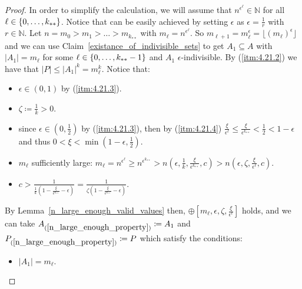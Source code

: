         \begin{proof}
            In order to simplify the calculation, we will assume that $n^{\epsilon^\ell} \in \mathbb{N}$ for all
            $\ell \in \left\{ 0, \dots, k_{**} \right\}$.
            Notice that can be easily achieved by setting $\epsilon$ as $\epsilon = \frac{1}{r}$ with $r \in \mathbb{N}$.
            Let $n = m_0 > m_1 > \dots > m_{k_{**}}$ with $m_\ell = n^{\epsilon^{\ell}}$.
            So $m_{\ell+1} = m_\ell^\epsilon = \lfloor (m_\ell)^\epsilon \rfloor$ and we can use Claim~\ref{existance_of_indivisible_sets}
            to get $A_1 \subseteq A$ with $|A_1| = m_\ell$ for some $\ell \in \left\{ 0, \dots, k_{**}-1 \right\}$ and $A_1$ $\epsilon$-indivisible.
            By (\ref{itm:4.21.2}) we have that $|P| \leq |A_1|^k = m_\ell^k$.
            Notice that:
            \begin{itemize}
                \item $\epsilon \in (0,1)$ by (\ref{itm:4.21.3}).
                \item $\zeta \coloneqq \frac{1}{k} > 0$.
                \item since $\epsilon \in \left( 0, \frac{1}{2} \right)$ by (\ref{itm:4.21.3}), then by (\ref{itm:4.21.4})
                    $\frac{\xi}{\epsilon^\ell} \leq \frac{\xi}{\epsilon^{k_{**}}} < \frac{1}{2} < 1 - \epsilon$ and
                    thus $0 < \xi < \min(1-\epsilon, \frac{1}{2})$.
                \item $m_\ell$ sufficiently large: $m_\ell = n^{\epsilon^\ell} \geq n^{\epsilon^{k_{**}}} > n\left( \epsilon, \frac{1}{k},
                    \frac{\xi}{\epsilon^{k_{**}}}, c \right) > n\left( \epsilon, \zeta, \frac{\xi}{\epsilon^{\ell}}, c \right)$.
                \item $c > \frac{1}{\frac{1}{k} (1 - \frac{\xi}{\epsilon^{k_{**}}} - \epsilon)}
                    = \frac{1}{\zeta (1 - \frac{\xi}{\epsilon^{k_{**}}} - \epsilon)}$.
            \end{itemize}
            By Lemma~\ref{n_large_enough_valid_values} then, $\oplus\left[ m_\ell, \epsilon, \zeta, \frac{\xi}{\epsilon^\ell} \right]$
            holds, and we can take $A_{(\ref{n_large_enough_property})} \coloneqq A_1$ and
            $P_{(\ref{n_large_enough_property})} \coloneqq P$ which satisfy the conditions:
            \begin{itemize}
                \item $|A_1| = m_\ell$.

\end{itemize}
\end{proof}
